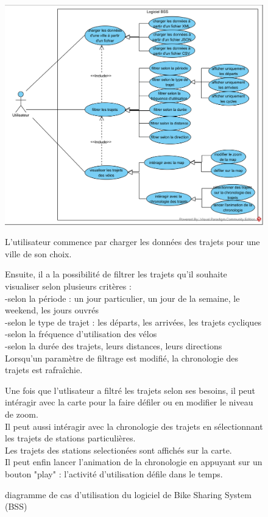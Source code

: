 \documentclass[12pt]{article}
\begin{document}
		\begin{figure}[!ht]
		\includegraphics[scale=1]{use_case_1.png}
		\caption{diagramme de cas d'utilisation du logiciel de Bike Sharing System (BSS)}
		\medskip
		L'utilisateur commence par charger les données des trajets pour une ville de son choix.\par

		Ensuite, il a la possibilité de filtrer les trajets qu'il souhaite visualiser selon plusieurs critères :\\
			-selon la période : un jour particulier, un jour de la semaine, le weekend, les jours ouvrés\\
			-selon le type de trajet : les départs, les arrivées, les trajets cycliques\\
			-selon la fréquence d'utilisation des vélos\\
			-selon la durée des trajets, leurs distances, leurs directions\\
		Lorsqu'un paramètre de filtrage est modifié, la chronologie des trajets est rafraîchie.\par

		Une fois que l'utlisateur a filtré les trajets selon ses besoins, il peut intéragir avec la carte pour la faire défiler ou en modifier le niveau de zoom.\\
		Il peut aussi intéragir avec la chronologie des trajets en sélectionnant les trajets de stations particulières.\\
		Les trajets des stations selectionées sont affichés sur la carte.\\
		Il peut enfin lancer l'animation de la chronologie en appuyant sur un bouton "play" : l'activité d'utilisation défile dans le temps.
		\end{figure}
		\newpage
\end{document}
